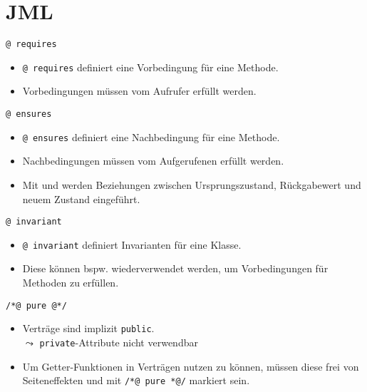 \documentclass{beamer}
\newcommand{\code}[1]{
	\begin{mdframed}
		
	\end{mdframed}
}
\begin{document}
\section{JML}

\begin{frame}{\texttt{@ requires}}
	\code{code/jml/requires.java}

	\begin{itemize}
		\item \texttt{@ requires} definiert eine Vorbedingung für eine Methode.
		\item Vorbedingungen müssen vom Aufrufer erfüllt werden.
	\end{itemize}
\end{frame}

\begin{frame}{\texttt{@ ensures}}
	\code{code/jml/ensures.java}

	\begin{itemize}
		\item \texttt{@ ensures} definiert eine Nachbedingung für eine Methode.
		\item Nachbedingungen müssen vom Aufgerufenen erfüllt werden.
        \item Mit \texttt{\string\old} und \texttt{\string\result} werden Beziehungen zwischen Ursprungszustand, Rückgabewert und neuem Zustand eingeführt.
	\end{itemize}
\end{frame}

\begin{frame}{\texttt{@ invariant}}
	\code{code/jml/invariant.java}

	\begin{itemize}
		\item \texttt{@ invariant} definiert Invarianten für eine Klasse.
		\item Diese können bspw. wiederverwendet werden, um Vorbedingungen für Methoden zu erfüllen.
	\end{itemize}
\end{frame}

\begin{frame}{\texttt{/*@ pure @*/}}
	\code{code/jml/pure.java}

	\begin{itemize}
		\item Verträge sind implizit \texttt{public}.\\
		$\leadsto$ \texttt{private}-Attribute nicht verwendbar
		\item Um Getter-Funktionen in Verträgen nutzen zu können, müssen diese frei von Seiteneffekten und mit \texttt{/*@ pure *@/} markiert sein.
	\end{itemize}
\end{frame}
\end{document}
